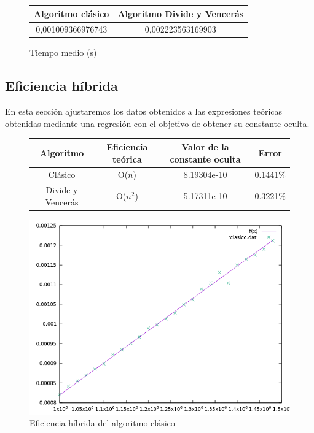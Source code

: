 \documentclass[12pt,spanish]{article}
\begin{document}
\begin{figure}[H]
\centering
\begin{tabular}{|c|c|}
\hline
\textbf{Algoritmo clásico} & \textbf{Algoritmo Divide y Vencerás} \\
\hline
0,001009366976743 & 0,002223563169903 \\
\hline
\end{tabular}
\caption{Tiempo medio (s)}
\end{figure}

\subsection{Eficiencia híbrida}

En esta sección ajustaremos los datos obtenidos a las expresiones teóricas obtenidas mediante una regresión con el objetivo de obtener su constante oculta.

\begin{figure}[H]
\centering
\begin{tabular}{|c|c|c|c|}
\hline
\textbf{Algoritmo} & \textbf{Eficiencia teórica} & \textbf{Valor de la constante oculta} & \textbf{Error} \\
\hline
Clásico & O($n$) & 8.19304e-10 &0.1441\% \\
Divide y Vencerás & O($n^2$) & 5.17311e-10 & 0.3221\% \\
\hline
\end{tabular}
\end{figure}

\newpage 

\begin{figure}[H]
\centering
\includegraphics[scale=0.75]{hibrida_clasico.png}
\caption{Eficiencia híbrida del algoritmo clásico}
\end{figure}
\end{document}
